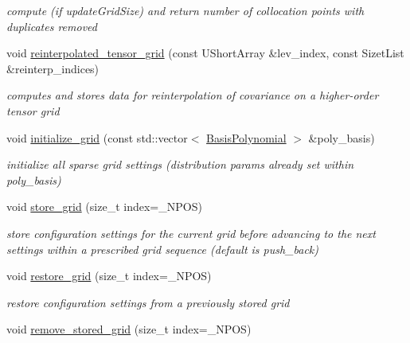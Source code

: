 \begin{DoxyCompactItemize}
\begin{DoxyCompactList}\small\item\em compute (if update\+Grid\+Size) and return number of collocation points with duplicates removed \end{DoxyCompactList}\item 
void \hyperlink{classPecos_1_1CombinedSparseGridDriver_a875c01d83eb38586e43712a94e713312}{reinterpolated\+\_\+tensor\+\_\+grid} (const U\+Short\+Array \&lev\+\_\+index, const Sizet\+List \&reinterp\+\_\+indices)\label{classPecos_1_1CombinedSparseGridDriver_a875c01d83eb38586e43712a94e713312}

\begin{DoxyCompactList}\small\item\em computes and stores data for reinterpolation of covariance on a higher-\/order tensor grid \end{DoxyCompactList}\item 
void \hyperlink{classPecos_1_1CombinedSparseGridDriver_a4a1a63a0f30824fcd233da026bdebef6}{initialize\+\_\+grid} (const std\+::vector$<$ \hyperlink{classPecos_1_1BasisPolynomial}{Basis\+Polynomial} $>$ \&poly\+\_\+basis)\label{classPecos_1_1CombinedSparseGridDriver_a4a1a63a0f30824fcd233da026bdebef6}

\begin{DoxyCompactList}\small\item\em initialize all sparse grid settings (distribution params already set within poly\+\_\+basis) \end{DoxyCompactList}\item 
void \hyperlink{classPecos_1_1CombinedSparseGridDriver_aeae6e6d94a2e3e77d612eee151c77799}{store\+\_\+grid} (size\+\_\+t index=\+\_\+\+N\+P\+OS)\label{classPecos_1_1CombinedSparseGridDriver_aeae6e6d94a2e3e77d612eee151c77799}

\begin{DoxyCompactList}\small\item\em store configuration settings for the current grid before advancing to the next settings within a prescribed grid sequence (default is push\+\_\+back) \end{DoxyCompactList}\item 
void \hyperlink{classPecos_1_1CombinedSparseGridDriver_a31ba839ff630bbc25292b448fff38a73}{restore\+\_\+grid} (size\+\_\+t index=\+\_\+\+N\+P\+OS)\label{classPecos_1_1CombinedSparseGridDriver_a31ba839ff630bbc25292b448fff38a73}

\begin{DoxyCompactList}\small\item\em restore configuration settings from a previously stored grid \end{DoxyCompactList}\item 
void \hyperlink{classPecos_1_1CombinedSparseGridDriver_a93215ecdfbc51b7c45998fa4d65fc7fd}{remove\+\_\+stored\+\_\+grid} (size\+\_\+t index=\+\_\+\+N\+P\+OS)\label{classPecos_1_1CombinedSparseGridDriver_a93215ecdfbc51b7c45998fa4d65fc7fd}


\end{DoxyCompactItemize}
